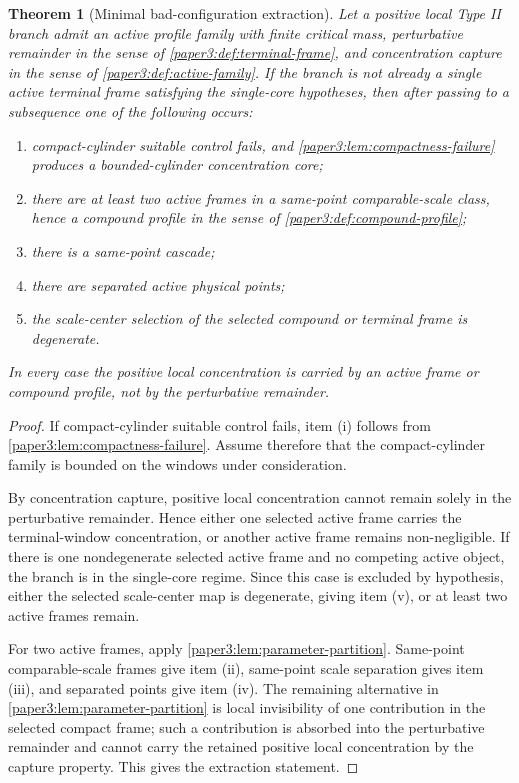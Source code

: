 \documentclass[11pt]{amsart}
\def\({}%
\def\){}%
\theoremstyle{plain}
\newtheorem{theorem}{Theorem}[section]
\theoremstyle{definition}
\theoremstyle{remark}
\begin{document}
\begin{theorem}[Minimal bad-configuration extraction]\label{paper3:thm:minimal-bad-extraction}
Let a positive local Type II branch admit an active profile family with finite
critical mass, perturbative remainder in the sense of
\cref{paper3:def:terminal-frame}, and concentration capture in the sense of
\cref{paper3:def:active-family}.  If the branch is not already a single active
terminal frame satisfying the single-core hypotheses, then after passing to a
subsequence one of the following occurs:
\begin{enumerate}[label=\textup{(\roman*)}]
\item compact-cylinder suitable control fails, and
\cref{paper3:lem:compactness-failure} produces a bounded-cylinder concentration core;
\item there are at least two active frames in a same-point comparable-scale
class, hence a compound profile in the sense of \cref{paper3:def:compound-profile};
\item there is a same-point cascade;
\item there are separated active physical points;
\item the scale-center selection of the selected compound or terminal frame is
degenerate.
\end{enumerate}
In every case the positive local concentration is carried by an active frame or
compound profile, not by the perturbative remainder.
\end{theorem}

\begin{proof}
If compact-cylinder suitable control fails, item \((i)\) follows from
\cref{paper3:lem:compactness-failure}.  Assume therefore that the compact-cylinder
family is bounded on the windows under consideration.
\par
By concentration capture, positive local concentration cannot remain solely in
the perturbative remainder.  Hence either one selected active frame carries the
terminal-window concentration, or another active frame remains non-negligible.
If there is one nondegenerate selected active frame and no competing active
object, the branch is in the single-core regime.  Since this case is
excluded by hypothesis, either the selected scale-center map is degenerate,
giving item \((v)\), or at least two active frames remain.
\par
For two active frames, apply \cref{paper3:lem:parameter-partition}.  Same-point
comparable-scale frames give item \((ii)\), same-point scale separation gives
item \((iii)\), and separated points give item \((iv)\).  The remaining
alternative in \cref{paper3:lem:parameter-partition} is local invisibility of one
contribution in the selected compact frame; such a contribution is absorbed
into the perturbative remainder and cannot carry the retained positive local
concentration by the capture property.  This gives the extraction statement.
\end{proof}
\end{document}
